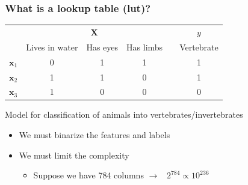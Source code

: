 \documentclass[pdflatex,compress]{beamer}
\begin{document}
\begin{frame}
	\frametitle{What is a lookup table (lut)?}
		\vspace{1em}
		\small
		\begin{minipage}{.95\linewidth}\centering
			\begin{table}[]
			\begin{tabular}{lccclc}
																 & \multicolumn{3}{c}{$\bm{X}$}                                                    &                       & \multicolumn{1}{c}{$y$}          \\
																 & Lives in water         & Has eyes               & Has limbs              &                       & \multicolumn{1}{c}{Vertebrate} \\ \cline{2-4} \cline{6-6} 
			\multicolumn{1}{l|}{$\bm{x}_1$} & \multicolumn{1}{c|}{0} & \multicolumn{1}{c|}{1} & \multicolumn{1}{c|}{1} & \multicolumn{1}{l|}{} & \multicolumn{1}{c|}{1}         \\ \cline{2-4} \cline{6-6} 
			\multicolumn{1}{l|}{$\bm{x}_2$} & \multicolumn{1}{c|}{1} & \multicolumn{1}{c|}{1} & \multicolumn{1}{c|}{0} & \multicolumn{1}{l|}{} & \multicolumn{1}{c|}{1}         \\ \cline{2-4} \cline{6-6} 
			\multicolumn{1}{l|}{$\bm{x}_3$} & \multicolumn{1}{c|}{1} & \multicolumn{1}{c|}{0} & \multicolumn{1}{c|}{0} & \multicolumn{1}{l|}{} & \multicolumn{1}{c|}{0}         \\ \cline{2-4} \cline{6-6} 
			\end{tabular}
			\end{table}
		\end{minipage}
	\centering
	Model for classification of animals into vertebrates/invertebrates
	\normalfont
	\vspace{1em}
	\begin{itemize}
		\item<2-> We must binarize the features and labels
		\item<3-> We must limit the complexity
			\begin{itemize}
				\item<4-> Suppose we have 784 columns $\rightarrow$ \, $2^{784} \propto 10^{236}$
			\end{itemize}
	\end{itemize}
\end{frame}
\end{document}
